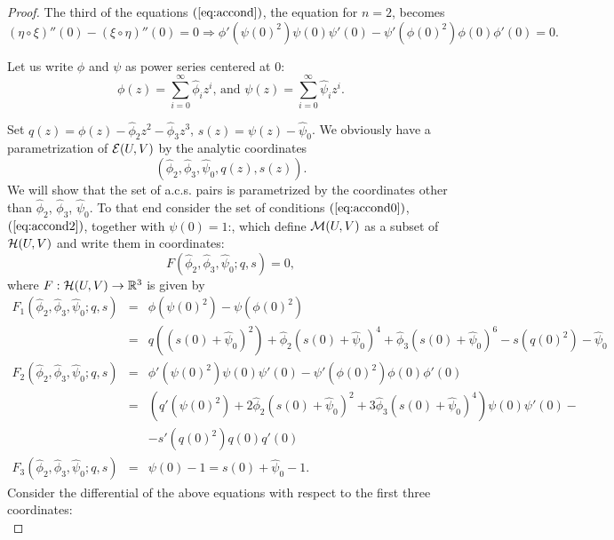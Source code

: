 \begin{proof}
{ The third of the equations $(\ref{eq:accond})$, the equation  for $n=2$}, becomes
\begin{equation}\label{eq:accond2}
 (\eta \circ \xi)''(0) -(\xi \circ \eta)''(0)=0 \Rightarrow \phi'(\psi(0)^2)  \psi (0)  \psi'(0)-\psi'(\phi(0)^2)  \phi (0)  \phi'(0)=0.
\end{equation}


Let us write $\phi$ and $\psi$ as power series centered at $0$:
$$\phi(z)=\sum_{i=0}^\infty \hat\phi_i z^i\text{, and } \psi(z)=\sum_{i=0}^\infty \hat\psi_i z^i.$$ 

Set
$q(z)=\phi(z)-\hat \phi_2 z^2 -\hat \phi_3 z^3$,    $s(z)=\psi(z)-\hat\psi_0$. We obviously have a parametrization of
$\mathcal{E}(U,V)$ by the analytic coordinates $$(\hat \phi_2,\hat \phi_3, \hat\psi_0,q(z),s(z)).$$ 
We will show that the set of a.c.s. pairs is parametrized by the coordinates
other than $\hat\phi_2$, $\hat\phi_3$, $\hat\psi_0$. 
To that end consider the set of conditions $(\ref{eq:accond0})$, $(\ref{eq:accond2})$, together with $\psi(0)=1$:,  which define
$\mathcal{M}(U,V)$ as a subset of $\mathcal{H}(U,V)$ and write them in coordinates:
\begin{equation} \label{classF}
F(\hat\phi_2,\hat\phi_3,\hat\psi_0; q,s)=0,
\end{equation}
where $F: \mathcal{H}(U,V) \to  \mathbb{R}^3$ is given by 
\begin{eqnarray}
\nonumber F_1(\hat\phi_2,\hat\phi_3, \hat\psi_0; q, s)&=&\phi(\psi(0)^2) - \psi(\phi(0)^2) \\
\nonumber     &=&q((s(0)+\hat\psi_0)^2) +\hat\phi_2 (s(0)+\hat\psi_0)^{4}+ \hat\phi_3 (s(0)+\hat\psi_0)^{6}- s(q(0)^2)-\hat\psi_0 \\
\nonumber   F_2(\hat\phi_2,\hat\phi_3, \hat\psi_0; q,s)&=&\phi'(\psi(0)^2) \psi(0) \psi'(0) - \psi'(\phi(0)^2) \phi(0) \phi'(0) \\
\nonumber     &=&\left(q'(\psi(0)^2)+2 \hat\phi_2 (s(0)+\hat\psi_0)^{2}+3 \hat\phi_3 (s(0)+\hat\psi_0)^{4} \right) \psi(0) \psi'(0) - \\
\nonumber  &\phantom{=}&  - s'(q(0)^2) q(0) q'(0) \\
\nonumber      F_3(\hat\phi_2,\hat\phi_3, \hat\psi_0; q, s)&=&\psi(0)-1=s(0)+\hat\psi_0-1.
\end{eqnarray}
Consider the differential of the above equations with respect to the first three coordinates:
\begin{equation}\label{eq:determinant}

\end{equation}
\end{proof}
